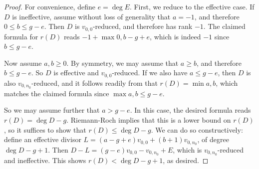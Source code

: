 \begin{proof}
    For convenience, define $e = \deg E$. First, we reduce to the effective case. If $D$ is ineffective, assume without loss of generality that $a = -1$, and therefore $0 \leq b \leq g - e$. Then $D$ is $v_{0,0}$-reduced, and therefore has rank $-1$. The claimed formula for $r(D)$ reads $-1 + \max{0, b - g + e }$, which is indeed $-1$ since $b \leq g-e$.

    Now assume $a,b \geq 0$. By symmetry, we may assume that $a \geq b$, and therefore $b \leq g - e$. So $D$ is effective and $v_{0,0}$-reduced. If we also have $a \leq g-e$, then $D$ is also $v_{0,n_0}$-reduced, and it follows readily from  that $r(D) = \min{a,b}$, which matches the claimed formula since $\max{a,b} \leq g-e$. 
    
    So we may assume further that $a > g-e$. In this case, the desired formula reads $r(D) = \deg D - g$. Riemann-Roch implies that this is a lower bound on $r(D)$, so it suffices to show that $r(D) \leq \deg D - g$. We can do so constructively: define an effective divisor $L = (a -g + e)v_{0,0} + (b+1) v_{0,n_0}$, of degree $\deg D -g + 1$. Then $D - L = (g-e) v_{0,0} - v_{0,n_0} + E$, which is $v_{0,n_0}$-reduced and ineffective. This shows $r(D) < \deg D - g + 1$, as desired.
\end{proof}

